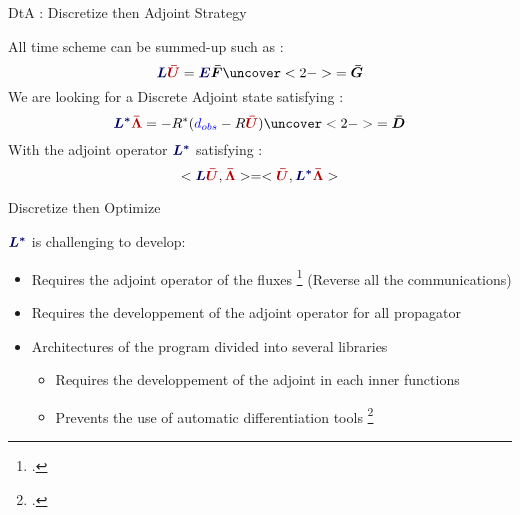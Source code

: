 \begin{frame}{DtA : Discretize then Adjoint Strategy}

    All time scheme can be summed-up such as :
    \begin{equation}
      \textcolor{\myblue}{\boldsymbol{L}}\discreteU=\textcolor{\myblue}{\boldsymbol{E}}\discreteF \uncover<2->{=\discreteG}
    \end{equation}
    We are looking for a Discrete Adjoint state satisfying :
    \begin{equation}
      \textcolor{\myblue}{\boldsymbol{L^*}}\discreteLbd=-R^*(\textcolor{blue}{d_{obs}}-R\discreteU) \uncover<2->{=\discreteD}
    \end{equation}
    With the adjoint operator $\textcolor{\myblue}{\boldsymbol{L^*}}$ satisfying :
      \begin{equation}
    <\textcolor{\myblue}{\boldsymbol{L}}\discreteU,\discreteLbd>=<\discreteU,\textcolor{\myblue}{\boldsymbol{L^*}}\discreteLbd>
      \end{equation}
\end{frame}



\begin{frame}{Discretize then Optimize}

  $\textcolor{\myblue}{\boldsymbol{L^*}}$ is challenging to develop:

  \begin{itemize}
  \item<2-> Requires the adjoint operator of the fluxes \footcite{wilcoxDiscretelyExactDerivatives2013} (Reverse all the communications)
  \item<3-> Requires the developpement of the adjoint operator for all propagator
  \item<4-> Architectures of the program divided into several libraries
    \begin{itemize}
    \item<5-> Requires the developpement of the adjoint in each inner functions
    \item<6-> Prevents the use of automatic differentiation tools \footcite{griewank2008evaluating}
    \end{itemize}
  \end{itemize}

\end{frame}







